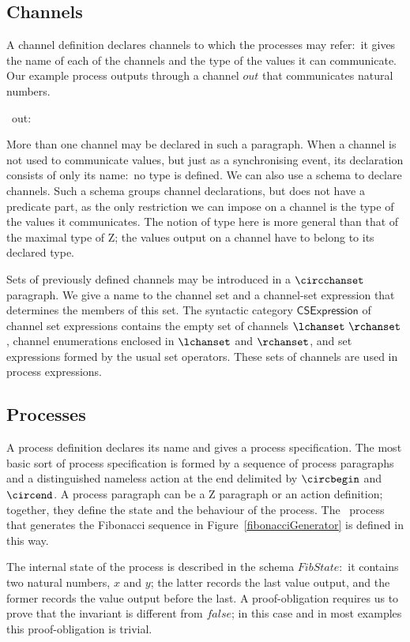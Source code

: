 \documentclass{article}
\begin{document}
\subsection{Channels}

A channel definition declares channels to which the processes may
refer:~it gives the name of each of the channels and the type of the
values it can communicate.  Our example process outputs through a
channel $out$ that communicates natural numbers.
\begin{zed}
  \circchannel\ out: \nat
\end{zed}
More than one channel may be declared in such a paragraph.  When a
channel is not used to communicate values, but just as a synchronising
event, its declaration consists of only its name:~no type is defined.
We can also use a schema to declare channels.  Such a schema groups
channel declarations, but does not have a predicate part, as the only
restriction we can impose on a channel is the type of the values it
communicates.  The notion of type here is more general than that of
the maximal type of Z; the values output on a channel have to belong
to its declared type.

Sets of previously defined channels may be introduced in a
$\circchanset$ paragraph.  We give a name to the channel set and a
channel-set expression that determines the members of this set.  The
syntactic category $\mathsf{CSExpression}$ of channel set expressions
contains the empty set of channels $\lchanset ~ \rchanset$, channel
enumerations enclosed in $\lchanset$ and $\rchanset$, and set
expressions formed by the usual set operators.  These sets of channels
are used in process expressions.

\subsection{Processes}

A process definition declares its name and gives a process
specification.  The most basic sort of process specification is formed
by a sequence of process paragraphs and a distinguished nameless
action at the end delimited by $\circbegin$ and $\circend$.  A process
paragraph can be a Z paragraph or an action definition; together, they
define the state and the behaviour of the process.  The \Circus\
process that generates the Fibonacci sequence in
Figure~\ref{fibonacciGenerator} is defined in this way.

The internal state of the process is described in the schema
$FibState$:~it contains two natural numbers, $x$ and $y$; the latter
records the last value output, and the former records the value output
before the last. A proof-obligation requires us to prove that the
invariant is different from $false$; in this case and in most examples
this proof-obligation is trivial.
\end{document}
